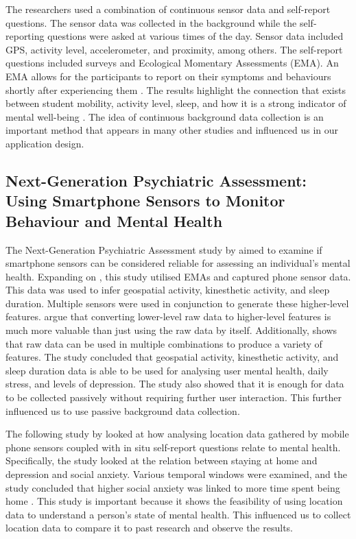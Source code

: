 \documentclass{l4proj}
\begin{document}
The researchers used a combination of continuous sensor data and self-report questions. The sensor data was collected in the background while the self-reporting questions were asked at various times of the day. Sensor data included GPS, activity level, accelerometer, and proximity, among others. The self-report questions included surveys and Ecological Momentary Assessments (EMA). An EMA allows for the participants to report on their symptoms and behaviours shortly after experiencing them \citep{ema_description}. The results highlight the connection that exists between student mobility, activity level, sleep, and how it is a strong indicator of mental well-being \citep{student_life_article}. The idea of continuous background data collection is an important method that appears in many other studies and influenced us in our application design. 

\subsection{Next-Generation Psychiatric Assessment: Using Smartphone Sensors to Monitor Behaviour and Mental Health} %
The Next-Generation Psychiatric Assessment study by \citet{next_gen_sensors} aimed to examine if smartphone sensors can be considered reliable for assessing an individual's mental health. Expanding on \citet{student_life_article}, this study utilised EMAs and captured phone sensor data. This data was used to infer geospatial activity, kinesthetic activity, and sleep duration. Multiple sensors were used in conjunction to generate these higher-level features. \citet{understanding_mental_healh_using_sensors_and_ml} argue that converting lower-level raw data to higher-level features is much more valuable than just using the raw data by itself. Additionally, \citet{understanding_mental_healh_using_sensors_and_ml} shows that raw data can be used in multiple combinations to produce a variety of features. The study concluded that geospatial activity, kinesthetic activity, and sleep duration data is able to be used for analysing user mental health, daily stress, and levels of depression. The study also showed that it is enough for data to be collected passively without requiring further user interaction. This further influenced us to use passive background data collection.

The following study by \citet{mobile_sensing_for_depression_social_anxiety} looked at how analysing location data gathered by mobile phone sensors coupled with in situ self-report questions relate to mental health. Specifically, the study looked at the relation between staying at home and depression and social anxiety. Various temporal windows were examined, and the study concluded that higher social anxiety was linked to more time spent being home \citep{mobile_sensing_for_depression_social_anxiety}. This study is important because it shows the feasibility of using location data to understand a person's state of mental health. This influenced us to collect location data to compare it to past research and observe the results.
\end{document}

